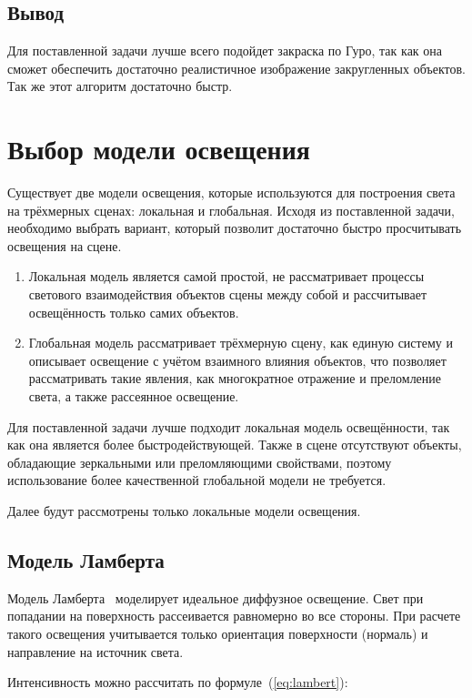 \subsection{Вывод}

Для поставленной задачи лучше всего подойдет закраска по Гуро, так как она сможет обеспечить достаточно реалистичное изображение закругленных объектов. Так же этот алгоритм достаточно быстр.


\section{Выбор модели освещения}

Существует две модели освещения, которые используются для построения света на трёхмерных сценах: локальная и глобальная. Исходя из поставленной задачи, необходимо выбрать вариант, который позволит достаточно быстро просчитывать освещения на сцене.

\begin{enumerate}
	\item Локальная модель является самой простой, не рассматривает процессы светового взаимодействия объектов сцены между собой и рассчитывает освещённость только самих объектов.
	\item Глобальная модель рассматривает трёхмерную сцену, как единую систему и описывает освещение с учётом взаимного влияния объектов, что позволяет рассматривать такие явления, как многократное отражение и преломление света, а также рассеянное освещение.
\end{enumerate}

Для поставленной задачи лучше подходит локальная модель освещённости, так как она является более быстродействующей. Также в сцене отсутствуют объекты, обладающие зеркальными или преломляющими свойствами, поэтому использование более качественной глобальной модели не требуется.

Далее будут рассмотрены только локальные модели освещения.


\subsection{Модель Ламберта}

Модель Ламберта~\cite{light} моделирует идеальное диффузное освещение. Свет при попадании на поверхность рассеивается равномерно во все стороны. При расчете такого освещения учитывается только ориентация поверхности (нормаль) и направление на источник света.  

Интенсивность можно рассчитать по формуле~(\ref{eq:lambert}):

